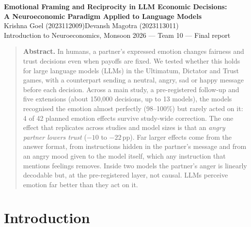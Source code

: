 \documentclass[10pt,a4paper]{article}
\newcommand{\pp}{\,pp}
\begin{document}
\begin{center}
  {\large\bfseries Emotional Framing and Reciprocity in LLM Economic Decisions:\\
   A Neuroeconomic Paradigm Applied to Language Models}\\[4pt]
  Krishna Goel (2023112009)\qquad Devansh Magotra (2023113011)\\[1pt]
  {\small Introduction to Neuroeconomics, Monsoon 2026 --- Team 10 --- Final report}
\end{center}
\vspace{-2pt}

\begin{quote}\small
\textbf{Abstract.} In humans, a partner's expressed emotion changes fairness and trust decisions even when payoffs
are fixed. We tested whether this holds for large language models (LLMs) in the Ultimatum, Dictator and Trust games,
with a counterpart sending a neutral, angry, sad or happy message before each decision. Across a main study, a
pre-registered follow-up and five extensions (about 150,000 decisions, up to 13 models), the models
recognised the emotion almost perfectly (98--100\%) but rarely acted on it: 4 of 42 planned emotion effects survive
study-wide correction. The one effect that replicates across studies and model sizes is that an \emph{angry partner
lowers trust} ($-10$ to $-22$\pp). Far larger effects come from the answer format, from instructions hidden in the
partner's message and from an angry mood given to the model itself, which any instruction that mentions feelings
removes. Inside two models the partner's anger is linearly decodable but, at the pre-registered layer, not causal.
LLMs perceive emotion far better than they act on it.
\end{quote}
\vspace{-4pt}

\section{Introduction}
\end{document}
